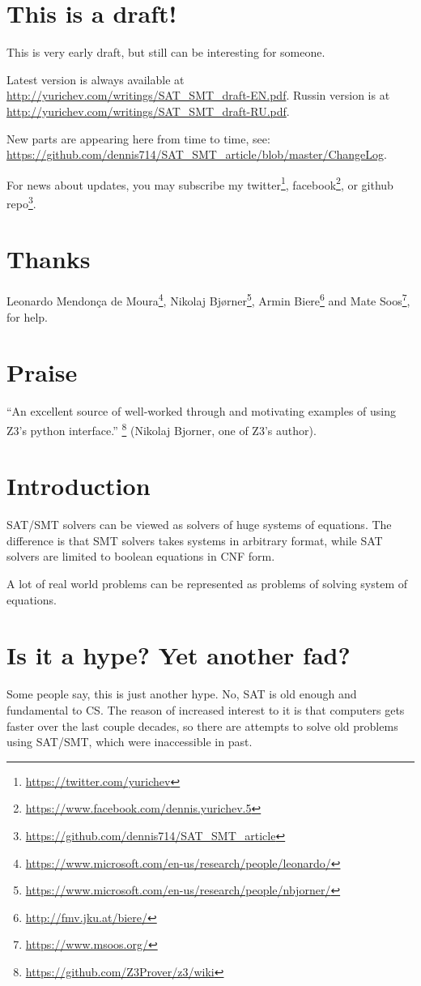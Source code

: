 \section{This is a draft!}

This is very early draft, but still can be interesting for someone.

Latest version is always available at \url{http://yurichev.com/writings/SAT_SMT_draft-EN.pdf}.
Russin version is at \url{http://yurichev.com/writings/SAT_SMT_draft-RU.pdf}.

New parts are appearing here from time to time, see: \url{https://github.com/dennis714/SAT_SMT_article/blob/master/ChangeLog}.

For news about updates, you may subscribe my 
twitter\footnote{\url{https://twitter.com/yurichev}}, 
facebook\footnote{\url{https://www.facebook.com/dennis.yurichev.5}}, 
or github repo\footnote{\url{https://github.com/dennis714/SAT_SMT_article}}.

\section{Thanks}

Leonardo Mendonça de Moura\footnote{\url{https://www.microsoft.com/en-us/research/people/leonardo/}},
Nikolaj Bjørner\footnote{\url{https://www.microsoft.com/en-us/research/people/nbjorner/}},
Armin Biere\footnote{\url{http://fmv.jku.at/biere/}} and
Mate Soos\footnote{\url{https://www.msoos.org/}},
for help.

\section{Praise}

``An excellent source of well-worked through and motivating examples of using Z3's python interface.''
\footnote{\url{https://github.com/Z3Prover/z3/wiki}}
(Nikolaj Bjorner, one of Z3's author).

\section{Introduction}

\ac{SAT}/\ac{SMT} solvers can be viewed as solvers of huge systems of equations.
The difference is that \ac{SMT} solvers takes systems in arbitrary format,
while \ac{SAT} solvers are limited to boolean equations in \ac{CNF} form.

A lot of real world problems can be represented as problems of solving system of equations.

\section{Is it a hype? Yet another fad?}

Some people say, this is just another hype.
No, \ac{SAT} is old enough and fundamental to \ac{CS}.
The reason of increased interest to it is that computers gets faster over the last couple decades,
so there are attempts to solve old problems using \ac{SAT}/\ac{SMT}, which were inaccessible in past.

